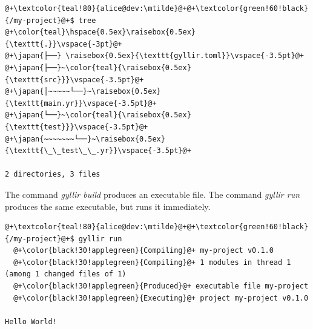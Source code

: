 \begin{lstlisting}[style=bashVerb, escapechar=@+]
@+\textcolor{teal!80}{alice@dev:\mtilde}@+@+\textcolor{green!60!black}{/my-project}@+$ tree
@+\color{teal}\hspace{0.5ex}\raisebox{0.5ex}{\texttt{.}}\vspace{-3pt}@+
@+\japan{├──} \raisebox{0.5ex}{\texttt{gyllir.toml}}\vspace{-3.5pt}@+
@+\japan{├──}~\color{teal}{\raisebox{0.5ex}{\texttt{src}}}\vspace{-3.5pt}@+
@+\japan{│~~~~~└──}~\raisebox{0.5ex}{\texttt{main.yr}}\vspace{-3.5pt}@+
@+\japan{└──}~\color{teal}{\raisebox{0.5ex}{\texttt{test}}}\vspace{-3.5pt}@+
@+\japan{~~~~~~~└──}~\raisebox{0.5ex}{\texttt{\_\_test\_\_.yr}}\vspace{-3.5pt}@+

2 directories, 3 files
\end{lstlisting}

The command \textit{gyllir build} produces an executable file. The
command \textit{gyllir run} produces the same executable, but runs it
immediately.

\begin{lstlisting}[style=bashVerb, escapechar=@+]
@+\textcolor{teal!80}{alice@dev:\mtilde}@+@+\textcolor{green!60!black}{/my-project}@+$ gyllir run
  @+\color{black!30!applegreen}{Compiling}@+ my-project v0.1.0
  @+\color{black!30!applegreen}{Compiling}@+ 1 modules in thread 1 (among 1 changed files of 1)
  @+\color{black!30!applegreen}{Produced}@+ executable file my-project
  @+\color{black!30!applegreen}{Executing}@+ project my-project v0.1.0

Hello World!
\end{lstlisting}

\vfill
\pagebreak

